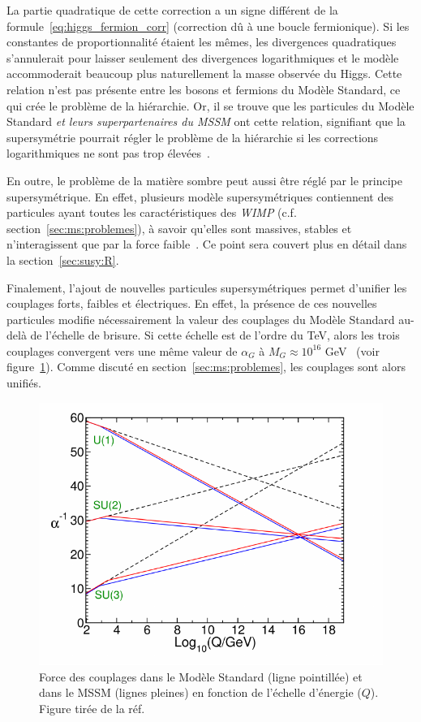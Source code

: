 La partie quadratique de cette correction a un signe différent de la
formule~\ref{eq:higgs_fermion_corr} (correction dû à une boucle
fermionique). Si les constantes de proportionnalité étaient les mêmes,
les divergences quadratiques s'annulerait pour laisser seulement des
divergences logarithmiques et le modèle accommoderait beaucoup plus
naturellement la masse observée du Higgs. Cette relation n'est pas
présente entre les bosons et fermions du Modèle Standard, ce qui crée
le problème de la hiérarchie.  Or, il se trouve que les particules du
Modèle Standard \emph{et leurs superpartenaires du MSSM} ont
cette relation, signifiant que la supersymétrie pourrait régler le
problème de la hiérarchie si les corrections logarithmiques ne sont
pas trop élevées~\cite{martin_supersymmetry_1997}.

En outre, le problème de la matière sombre peut aussi être réglé par
le principe supersymétrique. En effet, plusieurs modèle
supersymétriques contiennent des particules ayant toutes les
caractéristiques des \emph{WIMP}
(c.f. section~\ref{sec:ms:problemes}), à savoir qu'elles sont
massives, stables et n'interagissent que par la force
faible~\cite{olive_susy1_2014}. Ce point sera couvert plus en détail
dans la section~\ref{sec:susy:R}.

Finalement, l'ajout de nouvelles particules supersymétriques permet
d'unifier les couplages forts, faibles et électriques. En effet, la
présence de ces nouvelles particules modifie nécessairement la valeur
des couplages du Modèle Standard au-delà de l'échelle de brisure. Si
cette échelle est de l'ordre du TeV, alors les trois couplages
convergent vers une même valeur de $\alpha_G$ à $M_G \approx 10^{16}$
GeV~\cite{thomson_modern_2013} (voir figure~\ref{fig:unification}).
Comme discuté en section~\ref{sec:ms:problemes}, les couplages sont
alors unifiés.

\begin{figure}
  \centering
  \includegraphics{running_susy.pdf}
  \caption{Force des couplages dans le Modèle Standard (ligne
    pointillée) et dans le MSSM (lignes pleines) en fonction de
    l'échelle d'énergie ($Q$). Figure tirée de la
    réf.~\cite{martin_supersymmetry_1997}}
  \label{fig:unification}
\end{figure}

